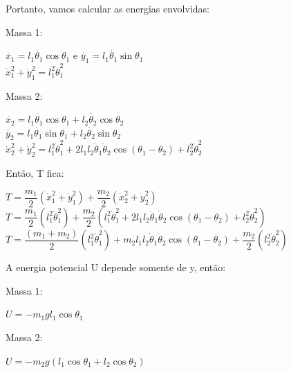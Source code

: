 \documentclass[13pt,a4paper]{report}
\begin{document}
Portanto, vamos calcular as energias envolvidas:

Massa 1:
\begin{center}
$
\dot{x_{1}} = l_{1}\dot{\theta_{1}}\cos\theta_{1}
$
e
$
\dot{y_{1}} = l_{1}\dot{\theta_{1}}\sin\theta_{1}
$
\\[2mm]
$
\dot{x}_{1}^{2} + \dot{y}_{1}^{2} = l_{1}^{2}\dot{\theta}_{1}^{2}
$
\end{center}

Massa 2:

\begin{center}
$
\dot{x_{2}} = l_{1}\dot{\theta_{1}}\cos\theta_{1} 
			+ l_{2}\dot{\theta_{2}}\cos\theta_{2}
$
\\[2mm]
$
\dot{y_{2}} = l_{1}\dot{\theta_{1}}\sin\theta_{1}
			+ l_{2}\dot{\theta_{2}}\sin\theta_{2}
$
\\[2mm]
$
\dot{x}_{2}^{2} + \dot{y}_{2}^{2} = l_{1}^{2}\dot{\theta}_{1}^{2}
+ 2l_{1}l_{2}\dot{\theta}_{1}\dot{\theta}_{2}\cos(\theta_{1} - \theta_{2})
+ l_{2}^{2}\dot{\theta}_{2}^{2}
$
\end{center}
Então, T fica:
\begin{center}
$
T  = \dfrac{m_{1}}{2}(\dot{x}_{1}^{2} + \dot{y}_{1}^{2}) 
	+ \dfrac{m_{2}}{2}(\dot{x}_{2}^{2} + \dot{y}_{2}^{2}) 
$
\\[2mm]
$
T  = \dfrac{m_{1}}{2}( l_{1}^{2}\dot{\theta}_{1}^{2} ) 
	+ \dfrac{m_{2}}{2}( l_{1}^{2}\dot{\theta}_{1}^{2}
+ 2l_{1}l_{2}\dot{\theta}_{1}\dot{\theta}_{2}\cos(\theta_{1} - \theta_{2})
+ l_{2}^{2}\dot{\theta}_{2}^{2} ) 
$
\\[2mm]
$
T  = \dfrac{ (m_{1} + m_{2}) }{2}( l_{1}^{2}\dot{\theta}_{1}^{2} ) 
	+ m_{2}l_{1}l_{2}\dot{\theta}_{1}\dot{\theta}_{2}\cos(\theta_{1} - \theta_{2})		+ \dfrac{m_{2}}{2}( l_{2}^{2}\dot{\theta}_{2}^{2} ) 
$
\end{center}
A energia potencial U depende somente de y, então:

Massa 1:
\begin{center}
$
U = -m_{1}gl_{1}\cos\theta_{1}
$
\end{center}

Massa 2:
\begin{center}
$
U = -m_{2}g ( l_{1}\cos\theta_{1} + l_{2}\cos\theta_{2} )
$
\end{center}
\end{document}
